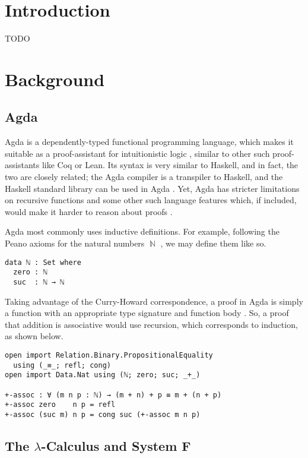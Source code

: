 \documentclass[logo,bsc,singlespacing,parskip,online]{infthesis}
\DeclareMathOperator{\nat}{\mathbb{N}}
\begin{document}
\chapter{Introduction}

TODO

\chapter{Background}

\section{Agda}
Agda is a dependently-typed functional programming language, which makes it
suitable as a proof-assistant for intuitionistic logic
\citep{norell_towards_2007}, similar to other such proof-assistants like Coq or
Lean. Its syntax is very similar to Haskell, and in fact, the two are closely
related; the Agda compiler is a transpiler to Haskell, and the Haskell standard
library can be used in Agda \citep{kusee_compiling_2017}. Yet, Agda has stricter
limitations on recursive functions and some other such language features which,
if included, would make it harder to reason about proofs
\citep{berghofer_brief_2009}.

Agda most commonly uses inductive definitions. For example, following the Peano
axioms for the natural numbers $\nat$ \citep{boolos_freges_1995}, we may define
them like so.

\begin{verbatim}
data ℕ : Set where
  zero : ℕ
  suc  : ℕ → ℕ
\end{verbatim}

Taking advantage of the Curry-Howard correspondence, a proof in Agda is simply a
function with an appropriate type signature and function body
\citep{wadler_propositions_2015}. So, a proof that addition is associative would
use recursion, which corresponds to induction, as shown below.

\begin{verbatim}
open import Relation.Binary.PropositionalEquality
  using (_≡_; refl; cong)
open import Data.Nat using (ℕ; zero; suc; _+_)

+-assoc : ∀ (m n p : ℕ) → (m + n) + p ≡ m + (n + p)
+-assoc zero    n p = refl
+-assoc (suc m) n p = cong suc (+-assoc m n p)
\end{verbatim}

\section{The $\lambda$-Calculus and System F}
\end{document}

